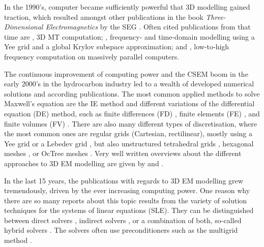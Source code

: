 \documentclass[
    paper,
  ]{geophysics}
\begin{document}
In the 1990's, computer became sufficiently powerful that 3D modelling gained traction, which resulted amongst other publications in the book \emph{Three-Dimensional Electromagnetics} by the SEG \citep{B.SEG.99.Oristaglio}. Often cited publications from that time are \cite{RSC.94.Mackie}, 3D MT computation; \cite{RS.94.Druskin}, frequency- and time-domain modelling using a Yee grid and a global Krylov subspace approximation; and \cite{RS.96.Alumbaugh, GJI.97.Newman}, low-to-high frequency computation on massively parallel computers.

The continuous improvement of computing power and the CSEM boom in the early 2000's in the hydrocarbon industry led to a wealth of developed numerical solutions and according publications. The most common applied methods to solve Maxwell's equation are the IE method \citep{GJI.74.Raiche, RS.02.Hursan, GEO.06.Zhdanov, GP.10.Tehrani, CAG.16.Kruglyakov, MGS.17.Kruglyakov} and different variations of the differential equation (DE) method, such as finite differences (FD) \citep{IEEE.66.Yee, GEO.93.Wang, RSC.94.Mackie, RS.94.Druskin, GEO.09.Streich, CAG.13.Sommer}, finite elements (FE) \citep{GEO.04.Commer, GJI.11.Schwarzbach,GEO.12.daSilva, GJI.13.Grayver, GJI.13.Puzyrev, SEG.16.Zhang}, and finite volumes (FV) \citep{EM.90.Madsen, SIAM.01.Haber, PIER.01.Clemens, GEO.14.Jahandari}. There are also many different types of discretisation, where the most common ones are regular grids (Cartesian, rectilinear), mostly using a Yee grid \citep{IEEE.66.Yee} or a Lebedev grid \citep{CMMP.64.Lebedev}, but also unstructured tetrahedral grids \citep{SEG.16.Zhang, CAG.17.Cai}, hexagonal meshes \citep{CAG.14.Cai}, or OcTree meshes \citep{ECP.07.Haber}. Very well written overviews about the different approaches to 3D EM modelling are given by \cite{SG.05.Avdeev} and \cite{SG.10.Borner}.

In the last 15 years, the publications with regards to 3D EM modelling grew tremendously, driven by the ever increasing computing power. One reason why there are so many reports about this topic results from the variety of solution techniques for the systems of linear equations (SLE). They can be distinguished between direct solvers \citep{GEO.09.Streich, GP.14.Chung, GEO.14.Jaysaval, GEO.15.Grayver, SEG.15.Oh, GJI.18.Wang}, indirect solvers \citep{GP.06.Mulder, GJI.15.Jaysaval}, or a combination of both, so-called hybrid solvers \citep{GEO.18.Liu}. The solvers often use preconditioners such as the multigrid method \citep{SIAM.02.Aruliah, GP.06.Mulder, GJI.16.Jaysaval}.
\end{document}

